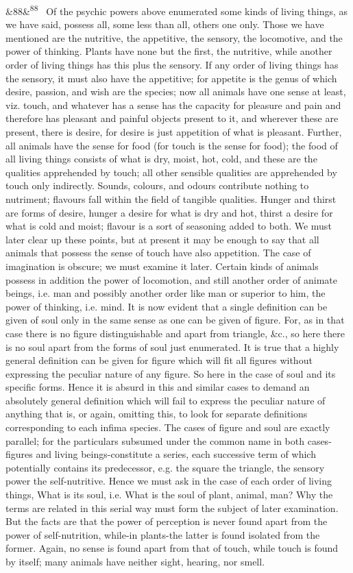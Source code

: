 \documentclass[12pt]{article}
\newcommand{\para}[1][]{\par\noindent\ifx&#1&\else\textsuperscript{\footnotesize #1}~\fi}
\begin{document}
\para[88] Of the psychic powers above enumerated some kinds of living things, as we have said, possess all, some less than all, others one only. Those we have mentioned are the nutritive, the appetitive, the sensory, the locomotive, and the power of thinking. Plants have none but the first, the nutritive, while another order of living things has this plus the sensory. If any order of living things has the sensory, it must also have the appetitive; for appetite is the genus of which desire, passion, and wish are the species; now all animals have one sense at least, viz. touch, and whatever has a sense has the capacity for pleasure and pain and therefore has pleasant and painful objects present to it, and wherever these are present, there is desire, for desire is just appetition of what is pleasant. Further, all animals have the sense for food (for touch is the sense for food); the food of all living things consists of what is dry, moist, hot, cold, and these are the qualities apprehended by touch; all other sensible qualities are apprehended by touch only indirectly. Sounds, colours, and odours contribute nothing to nutriment; flavours fall within the field of tangible qualities. Hunger and thirst are forms of desire, hunger a desire for what is dry and hot, thirst a desire for what is cold and moist; flavour is a sort of seasoning added to both. We must later clear up these points, but at present it may be enough to say that all animals that possess the sense of touch have also appetition. The case of imagination is obscure; we must examine it later. Certain kinds of animals possess in addition the power of locomotion, and still another order of animate beings, i.e. man and possibly another order like man or superior to him, the power of thinking, i.e. mind. It is now evident that a single definition can be given of soul only in the same sense as one can be given of figure. For, as in that case there is no figure distinguishable and apart from triangle, \&c., so here there is no soul apart from the forms of soul just enumerated. It is true that a highly general definition can be given for figure which will fit all figures without expressing the peculiar nature of any figure. So here in the case of soul and its specific forms. Hence it is absurd in this and similar cases to demand an absolutely general definition which will fail to express the peculiar nature of anything that is, or again, omitting this, to look for separate definitions corresponding to each infima species. The cases of figure and soul are exactly parallel; for the particulars subsumed under the common name in both cases-figures and living beings-constitute a series, each successive term of which potentially contains its predecessor, e.g. the square the triangle, the sensory power the self-nutritive. Hence we must ask in the case of each order of living things, What is its soul, i.e. What is the soul of plant, animal, man? Why the terms are related in this serial way must form the subject of later examination. But the facts are that the power of perception is never found apart from the power of self-nutrition, while-in plants-the latter is found isolated from the former. Again, no sense is found apart from that of touch, while touch is found by itself; many animals have neither sight, hearing, nor smell. 
\end{document}
